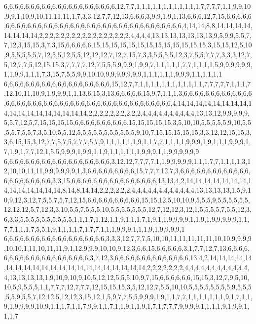 6,6,6,6,6,6,6,6,6,6,6,6,6,6,6,6,6,6,6,6,6,12,7,7,1,1,1,1,1,1,1,1,1,1,1,1,7,7,7,7,1,1,9,9,10,9,9,1,10,9,10,11,11,11,1,7,3,3,12,7,7,12,13,6,6,6,3,9,9,1,9,1,13,6,6,6,12,7,15,6,6,6,6,6,6,6,6,6,6,6,6,6,6,6,6,6,6,6,6,6,6,6,6,6,6,6,6,6,6,6,6,6,6,6,6,6,6,4,14,14,8,8,14,14,14,14,14,14,14,14,2,2,2,2,2,2,2,2,2,2,2,2,2,2,2,2,2,4,4,4,4,13,13,13,13,13,13,13,9,5,9,9,5,5,7,7,12,3,15,15,3,7,3,15,6,6,6,6,6,15,15,15,15,15,15,15,15,15,15,15,15,15,3,15,15,12,5,10,9,5,5,5,5,5,7,12,5,5,12,5,5,12,12,12,7,12,7,15,7,3,3,5,5,5,5,12,3,7,5,5,7,7,7,3,3,3,12,7,5,12,7,7,5,12,15,15,3,7,7,7,7,12,7,5,5,5,9,9,9,1,9,9,7,1,1,1,1,1,7,7,1,1,1,1,5,9,9,9,9,9,9,1,1,9,9,1,1,1,7,3,15,7,5,5,9,9,10,10,9,9,9,9,9,9,9,1,1,1,1,1,1,9,9,9,1,1,1,1,1,1
6,6,6,6,6,6,6,6,6,6,6,6,6,6,6,6,6,6,6,6,15,12,7,7,1,1,1,1,1,1,1,1,1,1,1,1,7,7,7,7,7,1,1,1,7,12,10,11,10,9,1,9,9,9,1,1,13,6,15,3,13,6,6,6,6,6,15,9,7,1,1,1,3,6,6,6,6,6,6,6,6,6,6,6,6,6,6,6,6,6,6,6,6,6,6,6,6,6,6,6,6,6,6,6,6,6,6,6,6,6,6,6,6,6,6,6,6,4,14,14,14,14,14,14,14,14,14,14,14,14,14,14,14,14,14,14,2,2,2,2,2,2,2,2,2,2,4,4,4,4,4,4,4,4,4,4,13,13,12,9,9,9,9,9,5,5,7,12,5,7,15,15,15,15,6,6,6,6,6,6,6,6,6,6,15,15,15,15,15,3,5,10,10,5,5,5,5,5,9,10,5,5,5,5,7,5,5,7,3,5,10,5,5,12,5,5,5,5,5,5,5,5,5,5,5,9,10,7,15,15,15,15,15,3,3,12,12,15,15,3,3,6,15,15,3,12,7,7,5,7,5,7,7,7,5,7,9,1,1,1,1,1,1,9,1,1,7,7,1,1,1,1,9,9,9,1,9,1,1,1,9,9,9,1,7,1,9,1,7,7,12,1,5,5,9,9,9,1,9,9,1,1,9,1,1,1,1,1,1,9,9,9,1,1,9,9,9,9,9,9
6,6,6,6,6,6,6,6,6,6,6,6,6,6,6,6,6,6,6,6,3,12,12,7,7,7,7,1,1,9,9,9,9,9,1,1,1,7,7,1,1,1,1,3,12,10,10,11,11,9,9,9,9,9,9,1,3,6,6,6,6,6,6,6,6,6,15,7,7,7,12,7,3,6,6,6,6,6,6,6,6,6,6,6,6,6,6,6,6,6,6,6,6,6,6,3,3,15,6,6,6,6,6,6,6,6,6,6,6,6,6,6,6,6,13,13,4,2,14,14,14,14,14,14,14,14,14,14,14,14,14,14,8,14,8,14,14,2,2,2,2,2,2,4,4,4,4,4,4,4,4,4,4,4,4,13,13,13,13,1,5,9,10,9,12,3,12,7,5,5,7,5,7,12,15,6,6,6,6,6,6,6,6,6,6,15,15,12,5,10,10,9,5,5,5,9,5,5,5,5,5,5,12,12,12,5,7,12,3,3,10,5,5,7,5,5,5,10,5,5,5,5,5,5,5,12,7,12,12,3,12,1,5,5,5,5,7,5,5,12,3,6,3,3,5,5,5,5,5,5,5,5,5,5,1,1,1,7,1,12,1,1,9,1,1,1,7,1,9,1,1,9,9,9,9,1,1,9,1,9,9,9,9,9,1,1,7,7,1,1,1,7,5,5,1,9,1,1,1,1,7,1,7,7,1,1,1,9,9,9,1,1,1,9,1,9,9,9,9,1
6,6,6,6,6,6,6,6,6,6,6,6,6,6,6,6,6,6,6,3,3,3,12,7,7,7,5,10,10,11,11,11,11,11,10,10,9,9,9,9,10,10,1,11,10,11,11,9,1,12,9,9,9,10,10,9,12,3,6,6,15,6,6,6,6,6,3,1,7,7,12,7,13,6,6,6,6,6,6,6,6,6,6,6,6,6,6,6,6,6,6,6,6,3,7,12,3,6,6,6,6,6,6,6,6,6,6,6,6,6,6,13,4,2,14,14,14,14,14,14,14,14,14,14,14,14,14,14,14,14,14,14,14,14,14,2,2,2,2,2,2,2,4,4,4,4,4,4,4,4,4,4,4,4,4,13,13,13,13,1,9,10,9,10,9,10,5,12,12,5,5,5,10,9,7,15,6,6,6,6,6,6,15,15,3,12,7,9,5,10,10,5,9,5,5,5,1,1,7,7,7,12,7,7,7,12,15,15,15,3,5,12,12,7,5,5,10,10,5,5,5,5,5,5,5,5,9,5,5,5,5,5,9,5,5,7,12,12,5,12,12,3,15,12,1,5,9,7,7,5,5,9,9,9,1,9,1,1,7,7,1,1,1,1,1,1,1,9,1,7,1,1,9,1,9,9,9,9,10,9,1,1,1,7,1,1,7,9,9,1,1,7,1,1,9,1,1,9,1,7,1,7,7,7,9,9,9,9,1,1,1,1,9,1,9,9,1,1,1,7
